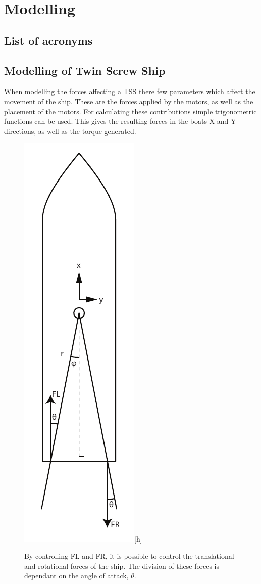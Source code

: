 \documentclass{article}
\begin{document}
\chapter{Modelling}
\section{List of acronyms}
\begin{acronym}[TDMA]
\end{acronym}

\section{Modelling of Twin Screw Ship}
When modelling the forces affecting a \ac{TSS} there few parameters which affect the movement of the ship. These are the forces applied by the motors, as well as the placement of the motors. For calculating these contributions simple trigonometric functions can be used. This gives the resulting forces in the boats X and Y directions, as well as the torque generated.
\begin{figure}
\includegraphics{img/boatmodel.pdf}[h]
\caption{By controlling FL and FR, it is possible to control the translational and rotational forces of the ship. The division of these forces is dependant on the angle of attack, $\theta$.}
\end{figure}
\end{document}
